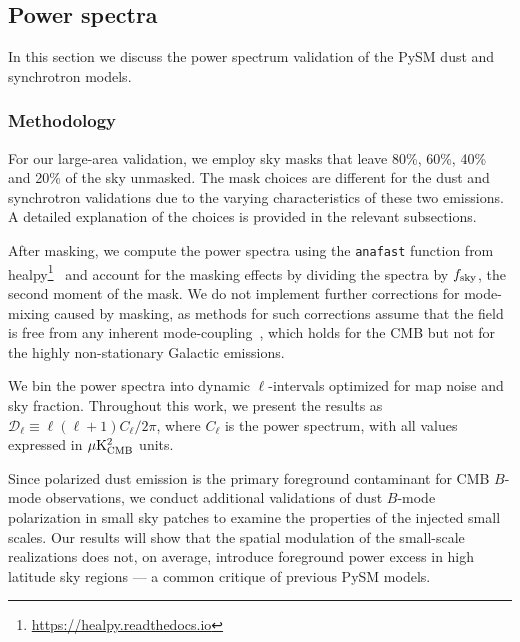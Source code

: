 \documentclass[twocolumn]{aastex631}
\begin{document}
\subsection{Power spectra}
\label{sec:PS-validation}
In this section we discuss the power spectrum validation of the PySM dust and synchrotron models. 

\subsubsection{Methodology} \label{subsubsec:methods}
For our large-area validation, we employ sky masks that leave 80\%, 60\%, 40\% and 20\% of the sky unmasked. The mask choices are different for the dust and synchrotron validations due to the varying characteristics of these two emissions. A detailed explanation of the choices is provided in the relevant subsections. 

After masking, we compute the power spectra using the \texttt{anafast} function from healpy\footnote{\url{https://healpy.readthedocs.io}}~\citep{Zonca:2019} and account for the masking effects by dividing the spectra by $f_{\rm sky}$, the second moment of the mask. We do not implement further corrections for mode-mixing caused by masking, as methods for such corrections assume that the field is free from any inherent mode-coupling~\citep[e.g.,][]{Hivon:2002}, which holds for the CMB but not for the highly non-stationary Galactic emissions. 

We bin the power spectra into dynamic $\ell$-intervals optimized for map noise and sky fraction. Throughout this work, we present the results as $\mathcal{D}_\ell \equiv \ell(\ell + 1) C_\ell / 2\pi$, where $C_\ell$ is the power spectrum, with all values expressed in $\mu{\rm K^2_{CMB}}$ units. 

Since polarized dust emission is the primary foreground contaminant for CMB $B$-mode observations, we conduct additional validations of dust $B$-mode polarization in small sky patches to examine the properties of the injected small scales. Our results will show that the spatial modulation of the small-scale realizations does not, on average, introduce foreground power excess in high latitude sky regions --- a common critique of previous PySM models. 
\end{document}
